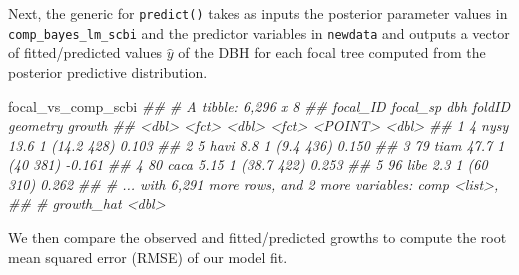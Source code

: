 \documentclass[12pt]{article}
\newenvironment{Shaded}{\begin{snugshade}}{\end{snugshade}}
\newcommand{\CommentTok}[1]{\textcolor[rgb]{0.56,0.35,0.01}{\textit{#1}}}
\newcommand{\DataTypeTok}[1]{\textcolor[rgb]{0.13,0.29,0.53}{#1}}
\newcommand{\KeywordTok}[1]{\textcolor[rgb]{0.13,0.29,0.53}{\textbf{#1}}}
\newcommand{\NormalTok}[1]{#1}
\newcommand{\OperatorTok}[1]{\textcolor[rgb]{0.81,0.36,0.00}{\textbf{#1}}}
\newcommand{\StringTok}[1]{\textcolor[rgb]{0.31,0.60,0.02}{#1}}
\begin{document}
Next, the generic for \texttt{predict()} takes as inputs the posterior
parameter values in \texttt{comp\_bayes\_lm\_scbi} and the predictor
variables in \texttt{newdata} and outputs a vector of fitted/predicted
values \(\widehat{y}\) of the DBH for each focal tree computed from the
posterior predictive distribution.

\begin{Shaded}
\end{Shaded}

\begin{Shaded}
\begin{Highlighting}[]
\NormalTok{focal_vs_comp_scbi}
\CommentTok{## # A tibble: 6,296 x 8}
\CommentTok{##   focal_ID focal_sp   dbh foldID                  geometry growth}
\CommentTok{##      <dbl> <fct>    <dbl> <fct>                    <POINT>  <dbl>}
\CommentTok{## 1        4 nysy     13.6  1                     (14.2 428)  0.103}
\CommentTok{## 2        5 havi      8.8  1                      (9.4 436)  0.150}
\CommentTok{## 3       79 tiam     47.7  1                       (40 381) -0.161}
\CommentTok{## 4       80 caca      5.15 1                     (38.7 422)  0.253}
\CommentTok{## 5       96 libe      2.3  1                       (60 310)  0.262}
\CommentTok{## # ... with 6,291 more rows, and 2 more variables: comp <list>,}
\CommentTok{## #   growth_hat <dbl>}
\end{Highlighting}
\end{Shaded}

We then compare the observed and fitted/predicted growths to compute the
root mean squared error (RMSE) of our model fit.

\begin{Shaded}
\end{Shaded}
\end{document}
